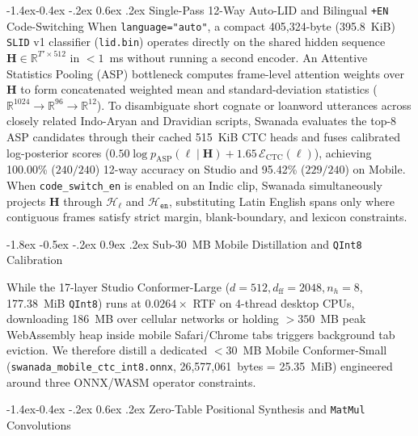 \documentclass[10pt,twocolumn]{article}
\makeatletter
\renewcommand\section{\@startsection {section}{1}{\z@}%
  {-1.8ex \@plus -0.5ex \@minus -.2ex}%
  {0.9ex \@plus.2ex}%
  {\normalfont\large\bfseries}}
\renewcommand\subsection{\@startsection{subsection}{2}{\z@}%
  {-1.4ex\@plus -0.4ex \@minus -.2ex}%
  {0.6ex \@plus .2ex}%
  {\normalfont\normalsize\bfseries}}
\makeatother
\begin{document}
\subsection{Single-Pass 12-Way Auto-LID and Bilingual \texttt{+EN} Code-Switching}
When \texttt{language="auto"}, a compact 405,324-byte (395.8~KiB) \texttt{SLID} v1 classifier (\texttt{lid.bin}) operates directly on the shared hidden sequence $\mathbf{H} \in \mathbb{R}^{T' \times 512}$ in $< 1$~ms without running a second encoder. An Attentive Statistics Pooling (ASP) bottleneck computes frame-level attention weights over $\mathbf{H}$ to form concatenated weighted mean and standard-deviation statistics ($\mathbb{R}^{1024} \to \mathbb{R}^{96} \to \mathbb{R}^{12}$). To disambiguate short cognate or loanword utterances across closely related Indo-Aryan and Dravidian scripts, Swanada evaluates the top-8 ASP candidates through their cached 515~KiB CTC heads and fuses calibrated log-posterior scores ($0.50 \log p_{\text{ASP}}(\ell \mid \mathbf{H}) + 1.65\,\mathcal{E}_{\text{CTC}}(\ell)$), achieving 100.00\% ($240/240$) 12-way accuracy on Studio and 95.42\% ($229/240$) on Mobile. When \texttt{code\_switch\_en} is enabled on an Indic clip, Swanada simultaneously projects $\mathbf{H}$ through $\mathcal{H}_\ell$ and $\mathcal{H}_{\texttt{en}}$, substituting Latin English spans only where contiguous frames satisfy strict margin, blank-boundary, and lexicon constraints.

\section{Sub-30~MB Mobile Distillation and \texttt{QInt8} Calibration}
\label{sec:distill}

While the 17-layer Studio Conformer-Large ($d = 512, d_{\text{ff}} = 2048, n_h = 8$, 177.38~MiB \texttt{QInt8}) runs at $0.0264\times$ RTF on 4-thread desktop CPUs, downloading 186~MB over cellular networks or holding $> 350$~MB peak WebAssembly heap inside mobile Safari/Chrome tabs triggers background tab eviction. We therefore distill a dedicated $< 30$~MB Mobile Conformer-Small (\texttt{swanada\_mobile\_ctc\_int8.onnx}, 26,577,061~bytes = 25.35~MiB) engineered around three ONNX/WASM operator constraints.

\subsection{Zero-Table Positional Synthesis and \texttt{MatMul} Convolutions}
\end{document}
